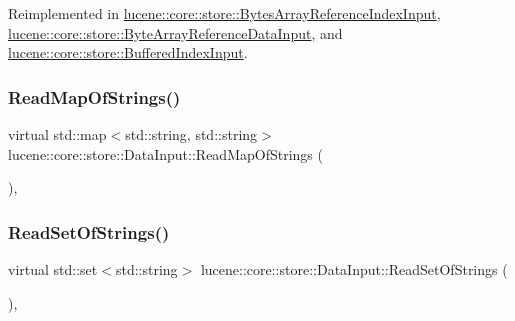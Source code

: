 Reimplemented in \mbox{\hyperlink{classlucene_1_1core_1_1store_1_1BytesArrayReferenceIndexInput_aad3b9103a7ef676a76e276a42cedaa38}{lucene\+::core\+::store\+::\+Bytes\+Array\+Reference\+Index\+Input}}, \mbox{\hyperlink{classlucene_1_1core_1_1store_1_1ByteArrayReferenceDataInput_a7e57de83aabc19fa44228bb2ee039d2e}{lucene\+::core\+::store\+::\+Byte\+Array\+Reference\+Data\+Input}}, and \mbox{\hyperlink{classlucene_1_1core_1_1store_1_1BufferedIndexInput_a1df116d1285059a70aff7cb2ede46906}{lucene\+::core\+::store\+::\+Buffered\+Index\+Input}}.

\mbox{\label{classlucene_1_1core_1_1store_1_1DataInput_a92ceac1fbe1d997031ecc57bf5e9306a}} 
\subsubsection{\texorpdfstring{Read\+Map\+Of\+Strings()}{ReadMapOfStrings()}}
{\footnotesize\ttfamily virtual std\+::map$<$std\+::string, std\+::string$>$ lucene\+::core\+::store\+::\+Data\+Input\+::\+Read\+Map\+Of\+Strings (\begin{DoxyParamCaption}{ }\end{DoxyParamCaption})\hspace{0.3cm}{\ttfamily [inline]}, {\ttfamily [virtual]}}

\mbox{\label{classlucene_1_1core_1_1store_1_1DataInput_a7d641dfa95887c123b813308c290b2c5}} 
\subsubsection{\texorpdfstring{Read\+Set\+Of\+Strings()}{ReadSetOfStrings()}}
{\footnotesize\ttfamily virtual std\+::set$<$std\+::string$>$ lucene\+::core\+::store\+::\+Data\+Input\+::\+Read\+Set\+Of\+Strings (\begin{DoxyParamCaption}{ }\end{DoxyParamCaption})\hspace{0.3cm}{\ttfamily [inline]}, {\ttfamily [virtual]}}

